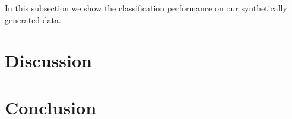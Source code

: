 \documentclass{llncs}
\begin{document}
In this subsection we show the classification performance on our synthetically generated data.




\section{Discussion}


\section{Conclusion}






%

%
\end{document}
